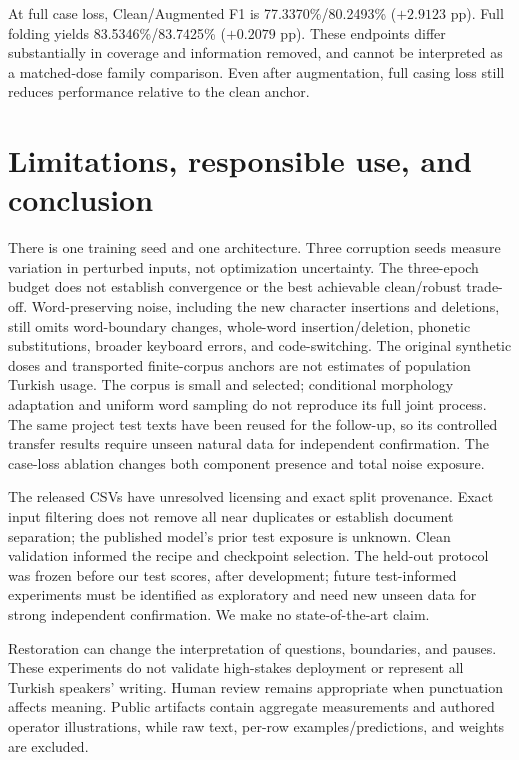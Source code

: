 \documentclass{article}
\begin{document}
At full case loss, Clean/Augmented F1 is 77.3370\%/80.2493\% ($+2.9123$ pp).
Full folding yields 83.5346\%/83.7425\% ($+0.2079$ pp). These endpoints differ
substantially in coverage and information removed, and cannot be interpreted
as a matched-dose family comparison. Even after augmentation, full casing loss
still reduces performance relative to the clean anchor.



\section{Limitations, responsible use, and conclusion}
There is one training seed and one architecture. Three corruption seeds measure
variation in perturbed inputs, not optimization uncertainty. The three-epoch
budget does not establish convergence or the best achievable clean/robust
trade-off. Word-preserving noise, including the new character insertions and
deletions, still omits word-boundary changes, whole-word insertion/deletion,
phonetic substitutions, broader keyboard errors, and code-switching. The original
synthetic doses and transported finite-corpus anchors are not estimates of
population Turkish usage. The corpus is small and selected; conditional
morphology adaptation and uniform word sampling do not reproduce its full joint
process. The same project test texts have been reused for the follow-up, so its
controlled transfer results require unseen natural data for independent
confirmation. The case-loss
ablation changes both component presence and total noise exposure.

The released CSVs have unresolved licensing and exact split provenance. Exact
input filtering does not remove all near duplicates or establish document
separation; the published model's prior test exposure is unknown. Clean
validation informed the recipe and checkpoint selection. The held-out protocol
was frozen before our test scores, after development; future test-informed
experiments must be identified as exploratory and need new unseen data for
strong independent confirmation. We make no state-of-the-art claim.

Restoration can change the interpretation of questions, boundaries, and pauses.
These experiments do not validate high-stakes deployment or represent all
Turkish speakers' writing. Human review remains appropriate when punctuation
affects meaning. Public artifacts contain aggregate measurements and authored
operator illustrations, while raw text, per-row examples/predictions, and
weights are excluded.
\end{document}

